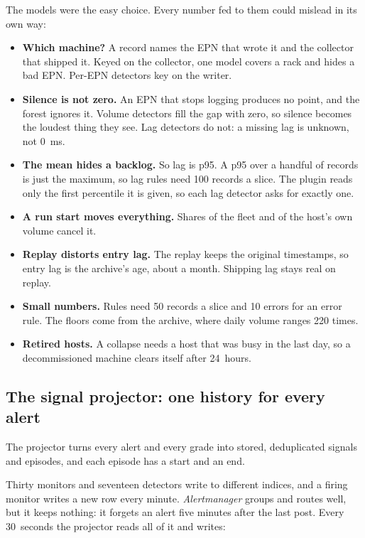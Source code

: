 The models were the easy choice. Every number fed to them could mislead in its own way:

\begin{itemize}
\item \textbf{Which machine?} A record names the EPN that wrote it and the collector that shipped it. Keyed on the collector, one model covers a rack and hides a bad EPN. Per-EPN detectors key on the writer.
\item \textbf{Silence is not zero.} An EPN that stops logging produces no point, and the forest ignores it. Volume detectors fill the gap with zero, so silence becomes the loudest thing they see. Lag detectors do not: a missing lag is unknown, not 0~ms.
\item \textbf{The mean hides a backlog.} So lag is p95. A p95 over a handful of records is just the maximum, so lag rules need 100 records a slice. The plugin reads only the first percentile it is given, so each lag detector asks for exactly one.
\item \textbf{A run start moves everything.} Shares of the fleet and of the host's own volume cancel it.
\item \textbf{Replay distorts entry lag.} The replay keeps the original timestamps, so entry lag is the archive's age, about a month. Shipping lag stays real on replay.
\item \textbf{Small numbers.} Rules need 50 records a slice and 10 errors for an error rule. The floors come from the archive, where daily volume ranges 220 times.
\item \textbf{Retired hosts.} A collapse needs a host that was busy in the last day, so a decommissioned machine clears itself after 24~hours.
\end{itemize}

\subsection{The signal projector: one history for every alert}\label{sec:metrics-projector}

The projector turns every alert and every grade into stored, deduplicated signals and episodes, and each episode has a start and an end.

Thirty monitors and seventeen detectors write to different indices, and a firing monitor writes a new row every minute. \textit{Alertmanager} \cite{ref:alertmanager} groups and routes well, but it keeps nothing: it forgets an alert five minutes after the last post. Every 30~seconds the projector reads all of it and writes:

